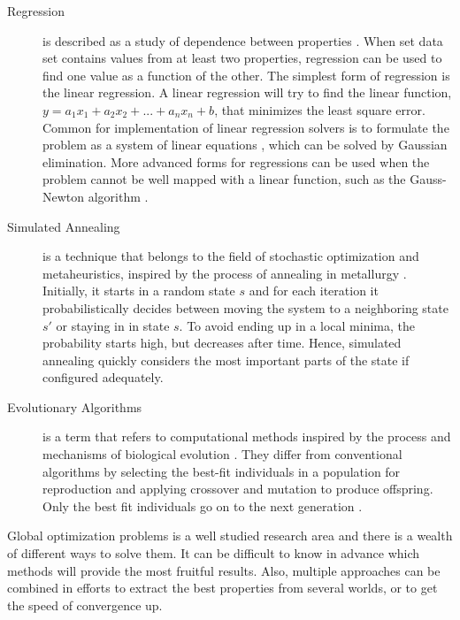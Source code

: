 \begin{description}
    \item[Regression] is described as a study of dependence between properties
        \cite{weisberg2005applied}. When set data set contains values from at
        least two properties, regression can be used to find one value as a
        function of the other. The simplest form of regression is the linear
        regression. A linear regression will try to find the linear function,
        $y=a_1x_1+a_2x_2+...+a_nx_n+b$, that minimizes the least square error.
        Common for implementation of linear regression solvers is to formulate
        the problem as a system of linear equations \cite{lay2011linear}, which
        can be solved by Gaussian elimination. More advanced forms for
        regressions can be used when the problem cannot be well mapped with a
        linear function, such as the Gauss-Newton algorithm
        \cite{myers1990classical}.

    \item[Simulated Annealing] is a technique that belongs to the field of
        stochastic optimization and metaheuristics, inspired by the process of
        annealing in metallurgy \cite{van1987simulated}. Initially, it starts in
        a random state $s$ and for each iteration it probabilistically decides
        between moving the system to a neighboring state $s'$ or staying in in
        state $s$. To avoid ending up in a local minima, the probability starts
        high, but decreases after time. Hence, simulated annealing quickly
        considers the most important parts of the state if configured adequately.

    \item[Evolutionary Algorithms] is a term that refers to computational
        methods inspired by the process and mechanisms of biological evolution
        \cite{fogel1997evolutionary}.  They differ from conventional algorithms
        by selecting the best-fit individuals in a population for reproduction
        and applying crossover and mutation to produce offspring. Only the best
        fit individuals go on to the next generation \cite{introtoga}.

\end{description}

Global optimization problems is a well studied research area and there is a
wealth of different ways to solve them. It can be difficult to know in advance
which methods will provide the most fruitful results. Also, multiple approaches
can be combined in efforts to extract the best properties from several worlds,
or to get the speed of convergence up.

